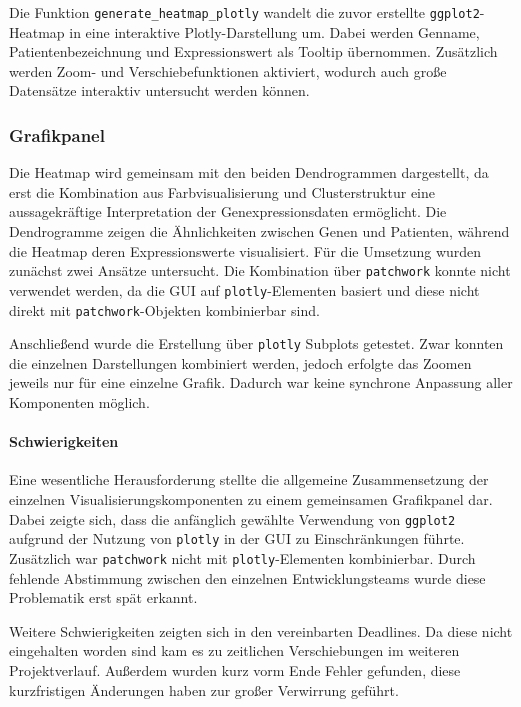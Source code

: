 \documentclass[12pt]{article}
\begin{document}
Die Funktion \texttt{generate\_heatmap\_plotly} wandelt die zuvor erstellte \texttt{ggplot2}-Heatmap in eine interaktive Plotly-Darstellung um. Dabei werden Genname, Patientenbezeichnung und Expressionswert als Tooltip übernommen. Zusätzlich werden Zoom- und Verschiebefunktionen aktiviert, wodurch auch große Datensätze interaktiv untersucht werden können.

\subsubsection{Grafikpanel}

Die Heatmap wird gemeinsam mit den beiden Dendrogrammen dargestellt, da erst die Kombination aus Farbvisualisierung und Clusterstruktur eine aussagekräftige Interpretation der Genexpressionsdaten ermöglicht. Die Dendrogramme zeigen die Ähnlichkeiten zwischen Genen und Patienten, während die Heatmap deren Expressionswerte visualisiert.
Für die Umsetzung wurden zunächst zwei Ansätze untersucht. Die Kombination über \texttt{patchwork} konnte nicht verwendet werden, da die GUI auf \texttt{plotly}-Elementen basiert und diese nicht direkt mit \texttt{patchwork}-Objekten kombinierbar sind.

Anschließend wurde die Erstellung über \texttt{plotly} Subplots getestet. Zwar konnten die einzelnen Darstellungen kombiniert werden, jedoch erfolgte das Zoomen jeweils nur für eine einzelne Grafik. Dadurch war keine synchrone Anpassung aller Komponenten möglich.


\paragraph{Schwierigkeiten}
Eine wesentliche Herausforderung stellte die allgemeine Zusammensetzung der einzelnen Visualisierungskomponenten zu einem gemeinsamen Grafikpanel dar. Dabei zeigte sich, dass die anfänglich gewählte Verwendung von \texttt{ggplot2} aufgrund der Nutzung von \texttt{plotly} in der GUI zu Einschränkungen führte. Zusätzlich war \texttt{patchwork} nicht mit \texttt{plotly}-Elementen kombinierbar. Durch fehlende Abstimmung zwischen den einzelnen Entwicklungsteams wurde diese Problematik erst spät erkannt.

Weitere Schwierigkeiten zeigten sich in den vereinbarten Deadlines. Da diese nicht eingehalten worden sind kam es zu zeitlichen Verschiebungen im weiteren Projektverlauf. Außerdem wurden kurz vorm Ende Fehler gefunden, diese kurzfristigen Änderungen haben zur großer Verwirrung geführt. 
\end{document}
